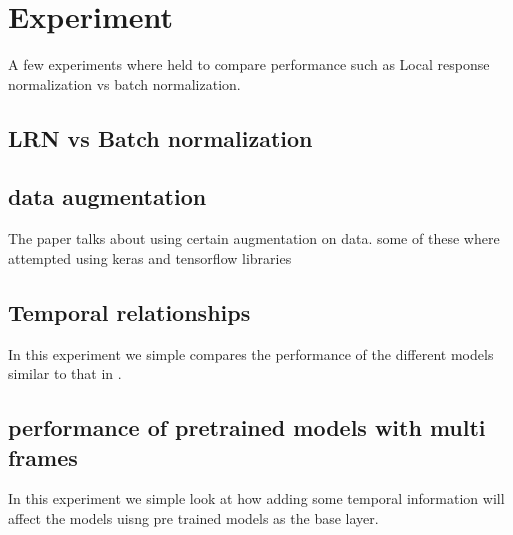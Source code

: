 \documentclass[10pt,phd,a4paper,oneside]{article}
\begin{document}
    \section{Experiment}
    A few experiments where held to compare performance such as Local response normalization vs batch normalization.
    \subsection{LRN vs Batch normalization}

    \subsection{data augmentation}
    The \citep{KarpathyCVPR14} paper talks about using certain augmentation on data. some of these where attempted using keras and tensorflow libraries

    \subsection{Temporal relationships}
    In this experiment we simple compares the performance of the different models similar to that in \citep{KarpathyCVPR14}.

    \subsection{performance of pretrained models with multi frames}
    In this experiment we simple look at how adding some temporal information will affect the models uisng pre trained models as the base layer.

\end{document}
